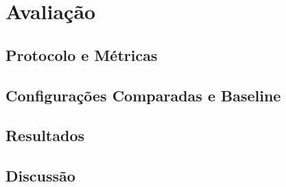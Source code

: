 \chapter{Avaliação}
\label{chap:avaliacao}

\section{Protocolo e Métricas}
\label{sec:avaliacao_protocolo}

\section{Configurações Comparadas e Baseline}
\label{sec:avaliacao_configuracoes}

\section{Resultados}
\label{sec:avaliacao_resultados}

\section{Discussão}
\label{sec:avaliacao_discussao}

